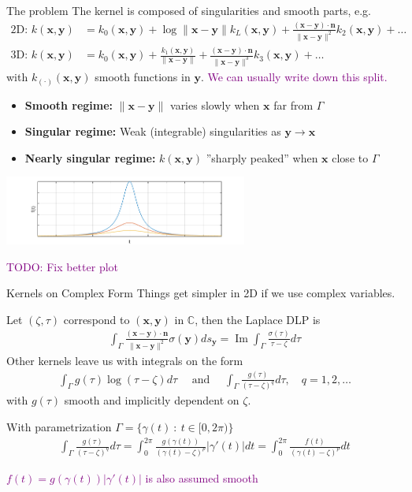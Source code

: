 \documentclass[t]{beamer}
\newcommand{\mbf}[1]{{\bm #1}}           %
\newcommand{\com}[1]{{\scriptsize \textcolor{purple}{#1}}}      %
\newcommand{\vg}{\vspace{2ex}}
\newcommand{\sg}{\vspace{1ex}}
\DeclareMathOperator{\im}{Im}
\newcommand{\xx}{\mbf{x}}
\newcommand{\yy}{\mbf{y}}
\newcommand{\nn}{\mbf{n}}
\begin{document}
\begin{frame}{The problem}
  The kernel is composed of singularities and smooth parts, e.g.
  \begin{align}
    \text{2D: }
    k(\xx, \yy) &= k_0(\xx, \yy) +
                  \log\|\xx-\yy\| k_L(\xx, \yy) +
                  \frac{(\xx-\yy)\cdot\nn}{\|\xx-\yy\|^2} k_2(\xx, \yy) + \dots
    \\
    \text{3D: }
    k(\xx, \yy) &= k_0(\xx, \yy) +
                  \frac{k_1(\xx, \yy)}{\|\xx-\yy\|}  + 
                  \frac{(\xx-\yy)\cdot\nn}{\|\xx-\yy\|^3} k_3(\xx, \yy) + \dots
  \end{align}
  with $k_{(\cdot)}(\xx,\yy)$ smooth functions in $\yy$. \com{We can usually write down this split.}

  \sg
  \begin{itemize}
  \item \textbf{Smooth regime:} $\|\xx-\yy\|$ varies slowly when $\xx$ far from $\Gamma$
  \item \textbf{Singular regime:} Weak (integrable) singularities as $\yy \to \xx$
  \item \textbf{Nearly singular regime:} $k(\xx,\yy)$ ''sharply
    peaked'' when $\xx$ close to $\Gamma$
  \end{itemize}
  \begin{center}
    \includegraphics[width=0.6\textwidth]{fig/kernel_curve}
  \end{center}
  \com{TODO: Fix better plot}
\end{frame}

\begin{frame}{Kernels on Complex Form}
  Things get simpler in 2D if we use complex variables.

  Let $(\zeta, \tau)$ correspond to $(\xx, \yy)$ in $\mathbb C$, then the Laplace DLP is
  \begin{align}
    \int_\Gamma \frac{(\xx-\yy)\cdot\nn}{\|\xx-\yy\|^2} \sigma(\yy) ds_\yy
    =
    \im \int_\Gamma \frac{\sigma(\tau)}{\tau-\zeta} d\tau
  \end{align}
  Other kernels leave us with integrals on the form
  \begin{align}
    \int_\Gamma g(\tau)\log(\tau-\zeta)d\tau \quad \text{ and } \quad
    \int_\Gamma \frac{g(\tau)}{(\tau-\zeta)^q} d\tau, \quad q=1,2,\dots
  \end{align}
  with $g(\tau)$ smooth and implicitly dependent on $\zeta$.

  \vg
  With parametrization $\Gamma = \{\gamma(t)\::\:t\in[0, 2\pi)  \}$
  \begin{align}
    \int_\Gamma \frac{g(\tau)}{(\tau-\zeta)^q} d\tau
    =
    \int_0^{2\pi} \frac{g(\gamma(t))}{(\gamma(t)-\zeta)^p} |\gamma'(t)| dt
    =
    \int_0^{2\pi} \frac{f(t)}{(\gamma(t)-\zeta)^p}dt
  \end{align}

  \com{$f(t)=g(\gamma(t))|\gamma'(t)|$ is also assumed smooth}
\end{frame}
\end{document}
